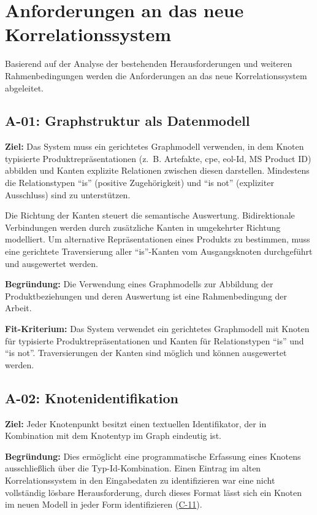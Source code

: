 \section{Anforderungen an das neue Korrelationssystem}\label{sec:requirements}

Basierend auf der Analyse der bestehenden Herausforderungen und weiteren Rahmenbedingungen werden die Anforderungen an das neue Korrelationssystem abgeleitet.

\subsection{A-01: Graphstruktur als Datenmodell}\label{subsec:req-format-product-graph}

\textbf{Ziel:}
Das System muss ein gerichtetes Graphmodell verwenden, in dem Knoten typisierte Produktrepräsentationen (z.\ B. Artefakte, \acrshort{cpe}, \acrshort{eol}-Id, MS Product ID) abbilden und Kanten explizite Relationen zwischen diesen darstellen.
Mindestens die Relationstypen \enquote{is} (positive Zugehörigkeit) und \enquote{is not} (expliziter Ausschluss) sind zu unterstützen.

Die Richtung der Kanten steuert die semantische Auswertung.
Bidirektionale Verbindungen werden durch zusätzliche Kanten in umgekehrter Richtung modelliert.
Um alternative Repräsentationen eines Produkts zu bestimmen, muss eine gerichtete Traversierung aller \enquote{is}-Kanten vom Ausgangsknoten durchgeführt und ausgewertet werden.

\textbf{Begründung:}
Die Verwendung eines Graphmodells zur Abbildung der Produktbeziehungen und deren Auswertung ist eine Rahmenbedingung der Arbeit.

\textbf{Fit-Kriterium:}
Das System verwendet ein gerichtetes Graphmodell mit Knoten für typisierte Produktrepräsentationen und Kanten für Relationstypen \enquote{is} und \enquote{is not}.
Traversierungen der Kanten sind möglich und können ausgewertet werden.

\subsection{A-02: Knotenidentifikation}\label{subsec:req-node-id-type}

\textbf{Ziel:}
Jeder Knotenpunkt besitzt einen textuellen Identifikator, der in Kombination mit dem Knotentyp im Graph eindeutig ist.

\textbf{Begründung:}
Dies ermöglicht eine programmatische Erfassung eines Knotens ausschließlich über die Typ-Id-Kombination.
Einen Eintrag im alten Korrelationssystem in den Eingabedaten zu identifizieren war eine nicht vollständig lösbare Herausforderung, durch dieses Format lässt sich ein Knoten im neuen Modell in jeder Form identifizieren (\hyperref[subsec:c-11-finding-yaml-entries]{C-11}).

